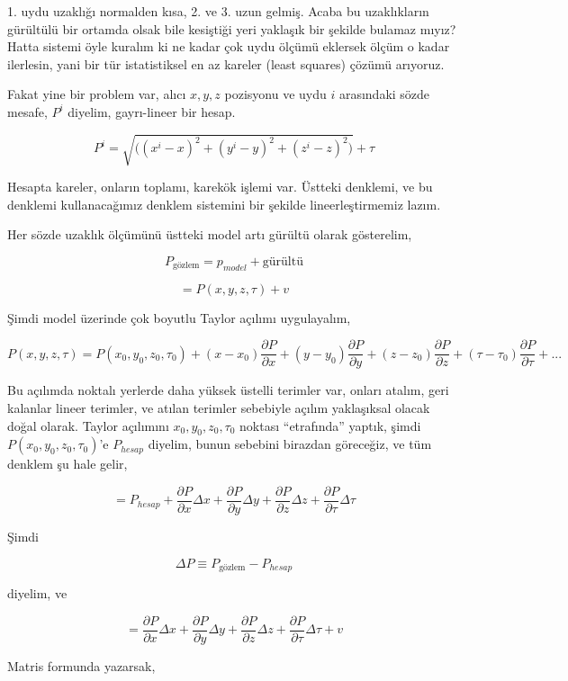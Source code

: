 \documentclass[12pt,fleqn]{article}\usepackage{../../common}
\begin{document}
1. uydu uzaklığı normalden kısa, 2. ve 3. uzun gelmiş. Acaba bu
uzaklıkların gürültülü bir ortamda olsak bile kesiştiği yeri yaklaşık bir
şekilde bulamaz mıyız? Hatta sistemi öyle kuralım ki ne kadar çok uydu
ölçümü eklersek ölçüm o kadar ilerlesin, yani bir tür istatistiksel en az
kareler (least squares) çözümü arıyoruz.

Fakat yine bir problem var, alıcı $x,y,z$ pozisyonu ve uydu $i$ arasındaki
sözde mesafe, $P^i$ diyelim, gayrı-lineer bir hesap.

$$ 
P^i = \sqrt{ \big( (x^i-x)^2 + (y^i-y)^2 + (z^i-z)^2  \big) } + \tau
$$

Hesapta kareler, onların toplamı, karekök işlemi var. Üstteki denklemi, ve
bu denklemi kullanacağımız denklem sistemini bir şekilde lineerleştirmemiz
lazım.

Her sözde uzaklık ölçümünü üstteki model artı gürültü olarak gösterelim,

$$ P_{\textrm{gözlem}} = p_{model} + \textrm{gürültü} $$

$$ = P(x,y,z,\tau) + v $$

Şimdi model üzerinde çok boyutlu Taylor açılımı uygulayalım, 

$$ 
P(x,y,z,\tau) = P(x_0,y_0,z_0,\tau_0) + 
(x-x_0)\frac{\partial P}{\partial x} + 
(y-y_0)\frac{\partial P}{\partial y} + 
(z-z_0)\frac{\partial P}{\partial z} + 
(\tau-\tau_0)\frac{\partial P}{\partial \tau}  + ...
$$

Bu açılımda noktalı yerlerde daha yüksek üstelli terimler var, onları
atalım, geri kalanlar lineer terimler, ve atılan terimler sebebiyle açılım
yaklaşıksal olacak doğal olarak. Taylor açılımını $x_0,y_0,z_0,\tau_0$
noktası ``etrafında'' yaptık, şimdi $ P(x_0,y_0,z_0,\tau_0)$'e $P_{hesap}$
diyelim, bunun sebebini birazdan göreceğiz, ve tüm denklem şu hale gelir,

$$ 
= P_{hesap} + \frac{\partial P}{\partial x} \Delta x + 
\frac{\partial P}{\partial y} \Delta y + 
\frac{\partial P}{\partial z} \Delta z + 
\frac{\partial P}{\partial \tau} \Delta \tau 
$$

Şimdi

$$ \Delta P \equiv P_{\textrm{gözlem}} - P_{hesap} $$

diyelim, ve

$$ 
= \frac{\partial P}{\partial x} \Delta x + 
\frac{\partial P}{\partial y} \Delta y + 
\frac{\partial P}{\partial z} \Delta z + 
\frac{\partial P}{\partial \tau} \Delta \tau 
+ v
$$

Matris formunda yazarsak, 
\end{document}
